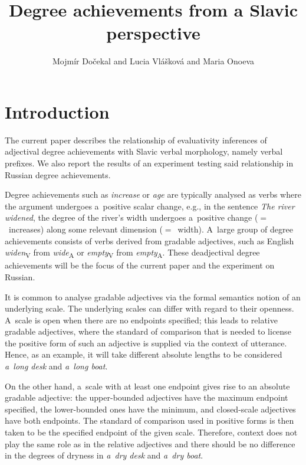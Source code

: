 \documentclass[output=paper]{langscibook}
\author{Mojmír Dočekal\affiliation{Masaryk University} and Lucia Vlášková\affiliation{Masaryk University} and Maria Onoeva\affiliation{Charles University}}
\title{Degree achievements from a Slavic perspective}
\begin{document}
\maketitle


\section{Introduction}\label{DA:sec:Introduction}

The current paper describes the relationship of evaluativity inferences of adjectival degree achievements with Slavic verbal morphology, namely verbal prefixes. We also report the results of an experiment testing  said relationship in Russian degree achievements.

Degree achievements such as \textit{increase} or \textit{age} are typically analysed as verbs where the argument undergoes a~positive scalar change, e.g., in the sentence \textit{The river widened}, the degree of the river's width undergoes a~positive change ($=$~increases) along some relevant dimension ($=$~width). A~large group of degree achievements consists of verbs derived from gradable adjectives, such as English \textit{widen}\textsubscript{V} from \textit{wide}\textsubscript{A} or \textit{empty}\textsubscript{V} from \textit{empty}\textsubscript{A}. These deadjectival degree achievements will be the focus of the current paper and the experiment on Russian.

It is common to analyse gradable adjectives via the formal semantics notion of an underlying scale. The underlying scales can differ with regard to their openness. A~scale is open when there are no endpoints specified; this leads to relative gradable adjectives, where the standard of comparison that is needed to license the positive form of such an adjective is supplied via the context of utterance. Hence, as an example, it will take different absolute lengths to be considered \textit{a~long desk} and \textit{a~long boat}. 

On the other hand, a~scale with at least one endpoint gives rise to an absolute gradable adjective: the upper-bounded adjectives have the maximum endpoint specified, the lower-bounded ones have the minimum, and closed-scale adjectives have both endpoints. The standard of comparison used in positive forms is then taken to be the specified endpoint of the given scale. Therefore, context does not play the same role as in the relative adjectives and there should be no difference in the degrees of dryness in \textit{a~dry desk} and \textit{a~dry boat}.
\end{document}
